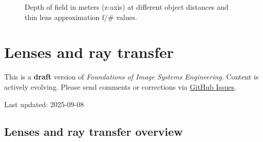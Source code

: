 \documentclass[
  letterpaper,
]{book}
\begin{document}
\begin{figure}


\caption{\label{fig-optics-dof}Depth of field in meters (z-axis) at
different object distances and thin lens approximation \(\mathrm{f}/\#\)
values.}

\end{figure}%

\chapter{Lenses and ray transfer}\label{sec-optics-morelenses}

\begin{tcolorbox}[enhanced jigsaw, colframe=quarto-callout-warning-color-frame, titlerule=0mm, rightrule=.15mm, opacitybacktitle=0.6, colback=white, leftrule=.75mm, coltitle=black, title=\textcolor{quarto-callout-warning-color}{\faExclamationTriangle}\hspace{0.5em}{Work in Progress}, bottomrule=.15mm, colbacktitle=quarto-callout-warning-color!10!white, breakable, left=2mm, bottomtitle=1mm, toptitle=1mm, opacityback=0, arc=.35mm, toprule=.15mm]

This is a \textbf{draft} version of \emph{Foundations of Image Systems
Engineering}. Content is actively evolving. Please send comments or
corrections via \href{https://github.com/wandell/FISE-git/issues}{GitHub
Issues}.

Last updated: 2025-09-08

\end{tcolorbox}

\section{Lenses and ray transfer
overview}\label{sec-optics-morelenses-overview}
\end{document}
